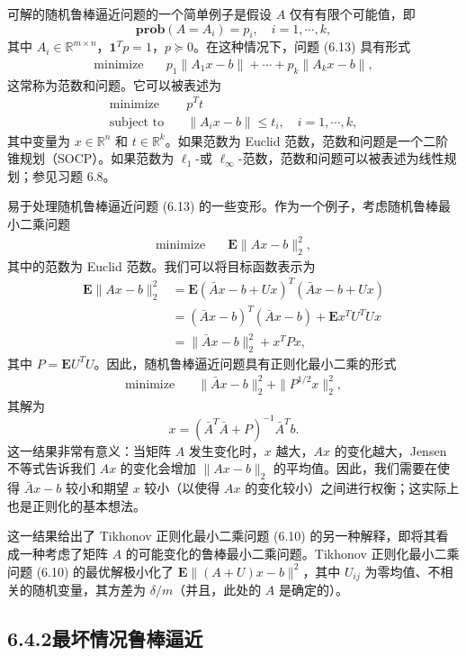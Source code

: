\documentclass[UTF8, 12pt, fontset=fandol, oneside]{ctexart}
\begin{document}
可解的随机鲁棒逼近问题的一个简单例子是假设 $A$ 仅有有限个可能值，即
\[
\mathbf{prob}(A=A_i)=p_i,\quad i=1,\cdots,k,
\]
其中 $A_i\in\mathbb{R}^{m\times n}$，$\mathbf{1}^Tp=1$，$p\succeq 0$。在这种情况下，问题 (6.13) 具有形式
\[
\begin{aligned}
\text{minimize}\quad & p_1\|A_1x-b\|+\cdots+p_k\|A_kx-b\|,
\end{aligned}
\]
这常称为范数和问题。它可以被表述为
\[
\begin{aligned}
\text{minimize}\quad & p^Tt\\
\text{subject to}\quad & \|A_ix-b\|\leq t_i,\quad i=1,\cdots,k,
\end{aligned}
\]
其中变量为 $x\in\mathbb{R}^n$ 和 $t\in\mathbb{R}^k$。如果范数为 Euclid 范数，范数和问题是一个二阶锥规划（SOCP）。如果范数为 $\ell_1$-或 $\ell_\infty$-范数，范数和问题可以被表述为线性规划；参见习题 6.8。

易于处理随机鲁棒逼近问题 (6.13) 的一些变形。作为一个例子，考虑随机鲁棒最小二乘问题
\[
\begin{aligned}
\text{minimize}\quad & \mathbf{E}\|Ax-b\|_2^2,
\end{aligned}
\]
其中的范数为 Euclid 范数。我们可以将目标函数表示为
\[
\begin{aligned}
\mathbf{E}\|Ax-b\|_2^2
&=\mathbf{E}(\bar{A}x-b+Ux)^T(\bar{A}x-b+Ux)\\
&=(\bar{A}x-b)^T(\bar{A}x-b)+\mathbf{E}x^TU^TUx\\
&=\|\bar{A}x-b\|_2^2+x^TPx,
\end{aligned}
\]
其中 $P=\mathbf{E}U^TU$。因此，随机鲁棒逼近问题具有正则化最小二乘的形式
\[
\begin{aligned}
\text{minimize}\quad & \|\bar{A}x-b\|_2^2+\|P^{1/2}x\|_2^2,
\end{aligned}
\]
其解为
\[
x=(\bar{A}^T\bar{A}+P)^{-1}\bar{A}^Tb.
\]
这一结果非常有意义：当矩阵 $A$ 发生变化时，$x$ 越大，$Ax$ 的变化越大，Jensen 不等式告诉我们 $Ax$ 的变化会增加 $\|Ax-b\|_2$ 的平均值。因此，我们需要在使得 $\bar{A}x-b$ 较小和期望 $x$ 较小（以使得 $Ax$ 的变化较小）之间进行权衡；这实际上也是正则化的基本想法。

这一结果给出了 Tikhonov 正则化最小二乘问题 (6.10) 的另一种解释，即将其看成一种考虑了矩阵 $A$ 的可能变化的鲁棒最小二乘问题。Tikhonov 正则化最小二乘问题 (6.10) 的最优解极小化了 $\mathbf{E}\|(A+U)x-b\|^2$，其中 $U_{ij}$ 为零均值、不相关的随机变量，其方差为 $\delta/m$（并且，此处的 $A$ 是确定的）。

\subsection*{6.4.2\quad 最坏情况鲁棒逼近}
\end{document}
